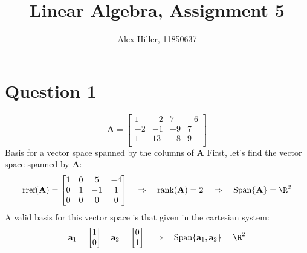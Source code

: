 \documentclass{article}
\author{Alex Hiller, 11850637}
\title{Linear Algebra, Assignment 5}
\begin{document}
\maketitle
\section{Question 1} 
\[%
    \mathbf{A}
    =
    \begin{bmatrix}
        1 & -2 & 7 & -6 \\
		-2 & -1 & -9 & 7 \\
		1 & 13 & -8 & 9 \\
    \end{bmatrix}
\]%
Basis for a vector space spanned by the columns of $ \mathbf{A} $
First, let's find the vector space spanned by $ \mathbf{A}  $:
\[%
    \text{rref} (\mathbf{A}) 
    =
    \begin{bmatrix}
        1 & 0 & 5 & -4 \\
		0 & 1 & -1 & 1 \\
		0 & 0 & 0 & 0 \\
    \end{bmatrix}
    \quad \Rightarrow \quad
    \text{rank} ( \mathbf{A} ) = 2
    \quad \Rightarrow \quad
    \text{Span} \{ \mathbf{A} \} = \R^{2}
\]%
A valid basis for this vector space is that given in the cartesian system:
\[%
    \mathbf{a}_1 
    =
    \begin{bmatrix}
        1 \\0 \\
    \end{bmatrix}
    \quad
    \mathbf{a}_2
    =
    \begin{bmatrix}
        0 \\ 1 \\
    \end{bmatrix}
    \quad
    \Rightarrow 
    \quad
    \text{Span} \{ \mathbf{a}_{1} , \mathbf{a}_{2}  \} = \R^{2}
\]%
\end{document}
